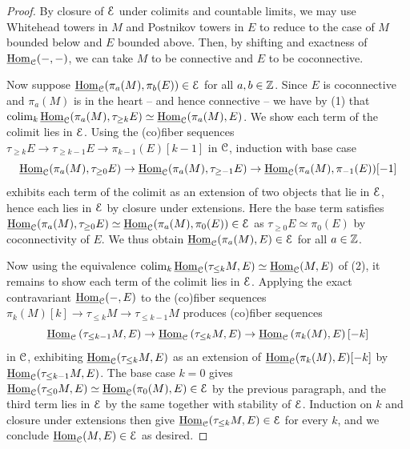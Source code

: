 \begin{proof}
    By closure of $\EuScript{E}$ under colimits and countable limits, we may use Whitehead towers in $M$ and Postnikov towers in $E$ to reduce to the case of $M$ bounded below and $E$ bounded above. Then, by shifting and exactness of $\underline{\mathrm{Hom}}_{\EuScript{C}}(-,-)$, we can take $M$ to be connective and $E$ to be coconnective.

    Now suppose $\underline{\mathrm{Hom}}_{\EuScript{C}}(\pi_{a}(M),\pi_{b}(E))\in\EuScript{E}$ for all $a,b\in\mathbb{Z}$. Since $E$ is coconnective and $\pi_{a}(M)$ is in the heart -- and hence connective -- we have by  (1) that $\operatorname*{colim}_{k}\underline{\mathrm{Hom}}_{\EuScript{C}}(\pi_{a}(M),\tau_{\geq k}E)\simeq\underline{\mathrm{Hom}}_{\EuScript{C}}(\pi_{a}(M),E)$. We show each term of the colimit lies in $\EuScript{E}$. Using the (co)fiber sequences $\tau_{\geq k}E\to\tau_{\geq k-1}E\to\pi_{k-1}(E)[k-1]$ in $\EuScript{C}$, induction with base case 
    $$\underline{\mathrm{Hom}}_{\EuScript{C}}(\pi_{a}(M),\tau_{\geq 0}E)\to\underline{\mathrm{Hom}}_{\EuScript{C}}(\pi_{a}(M),\tau_{\geq -1}E)\to\underline{\mathrm{Hom}}_{\EuScript{C}}(\pi_{a}(M),\pi_{-1}(E))[-1]$$
    exhibits each term of the colimit as an extension of two objects that lie in $\EuScript{E}$, hence each lies in $\EuScript{E}$ by closure under extensions. Here the base term satisfies $\underline{\mathrm{Hom}}_{\EuScript{C}}(\pi_{a}(M),\tau_{\geq 0}E)\simeq\underline{\mathrm{Hom}}_{\EuScript{C}}(\pi_{a}(M),\pi_{0}(E))\in\EuScript{E}$ as $\tau_{\geq0}E\simeq\pi_{0}(E)$ by coconnectivity of $E$. We thus obtain $\underline{\mathrm{Hom}}_{\EuScript{C}}(\pi_{a}(M),E)\in\EuScript{E}$ for all $a\in\mathbb{Z}$.

    Now using the equivalence $\operatorname*{colim}_{k}\underline{\mathrm{Hom}}_{\EuScript{C}}(\tau_{\leq k}M, E)\simeq\underline{\mathrm{Hom}}_{\EuScript{C}}(M, E)$ of  (2), it remains to show each term of the colimit lies in $\EuScript{E}$. Applying the exact contravariant $\underline{\mathrm{Hom}}_{\EuScript{C}}(-,E)$ to the (co)fiber sequences $\pi_{k}(M)[k]\to\tau_{\leq k}M\to\tau_{\leq k-1}M$ produces (co)fiber sequences 
    $$\underline{\mathrm{Hom}}_{\EuScript{C}}\left(\tau_{\leq k-1}M,E\right)\to\underline{\mathrm{Hom}}_{\EuScript{C}}\left(\tau_{\leq k}M,E\right)\to\underline{\mathrm{Hom}}_{\EuScript{C}}\left(\pi_{k}(M),E\right)[-k]$$
    in $\EuScript{C}$, exhibiting $\underline{\mathrm{Hom}}_{\EuScript{C}}(\tau_{\leq k}M,E)$ as an extension of $\underline{\mathrm{Hom}}_{\EuScript{C}}(\pi_{k}(M),E)[-k]$ by $\underline{\mathrm{Hom}}_{\EuScript{C}}(\tau_{\leq k-1}M,E)$. The base case $k=0$ gives $\underline{\mathrm{Hom}}_{\EuScript{C}}(\tau_{\leq 0}M,E)\simeq\underline{\mathrm{Hom}}_{\EuScript{C}}(\pi_{0}(M),E)\in\EuScript{E}$ by the previous paragraph, and the third term lies in $\EuScript{E}$ by the same together with stability of $\EuScript{E}$. Induction on $k$ and closure under extensions then give $\underline{\mathrm{Hom}}_{\EuScript{C}}(\tau_{\leq k}M,E)\in\EuScript{E}$ for every $k$, and we conclude $\underline{\mathrm{Hom}}_{\EuScript{C}}(M, E)\in\EuScript{E}$ as desired. 
\end{proof}
